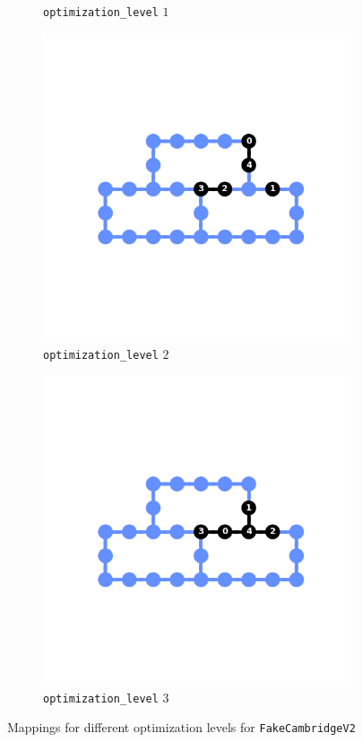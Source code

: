 \documentclass[11pt]{article}
\begin{document}
\begin{figure}[hbtp]
\begin{subfigure}{0.24\linewidth}
        \caption{\texttt{optimization\_level} $1$}
    \end{subfigure}
    \begin{subfigure}{0.24\linewidth}
        \centering
        \includegraphics[width=\linewidth]{outputs/routing_FakeCambridgeV2_2.png}
        \caption{\texttt{optimization\_level} $2$}
    \end{subfigure}
    \begin{subfigure}{0.24\linewidth}
        \centering
        \includegraphics[width=\linewidth]{outputs/routing_FakeCambridgeV2_3.png}
        \caption{\texttt{optimization\_level} $3$}
    \end{subfigure}
    \caption{Mappings for different optimization levels for \texttt{FakeCambridgeV2}}
    \label{fig:routing_cambridge}
\end{figure}
\end{document}
